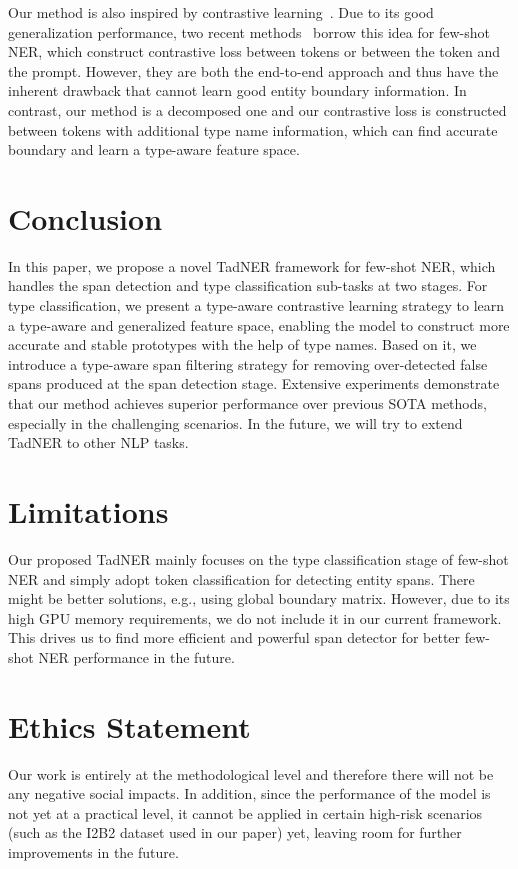 \documentclass[11pt]{article}
\newcommand{\ours}{{TadNER}\xspace}
\begin{document}
Our method is also inspired by contrastive learning~\cite{pmlr-v119-chen20j,NEURIPS2020_d89a66c7_supervised_contrastive_learning}.
Due to its good generalization performance, two recent methods~\cite{das-etal-2022-container,huang-etal-2022-copner} borrow this idea for few-shot NER, which construct contrastive loss between tokens or between the token and the prompt.
However, they are both the end-to-end approach and thus have the inherent drawback that cannot learn good entity boundary information.
In contrast, our method is a decomposed one and our contrastive loss is constructed between tokens with additional type name information, which can find accurate boundary and learn a type-aware feature space.





\section{Conclusion}
In this paper, we propose a novel \ours framework  for few-shot NER, which handles the span detection and type classification sub-tasks at two stages.
For type classification, we present a type-aware contrastive learning  strategy to learn a type-aware and generalized feature space, enabling the model to construct more accurate and stable prototypes with the help of type names.
Based on it, we introduce a type-aware span filtering strategy for removing over-detected false spans produced at the span detection stage.
Extensive experiments demonstrate that our method achieves superior performance over previous SOTA methods, especially in the challenging scenarios.
In the future, we will try to extend \ours to other NLP tasks.





\section*{Limitations}
Our proposed \ours mainly focuses on the type classification stage of few-shot NER and simply adopt token classification for detecting entity spans.
There might be better solutions, e.g., using global boundary matrix. 
However, due to its high GPU memory requirements, we do not include it in our current framework. 
This drives us to find more efficient and powerful span detector for better few-shot NER performance in the future.

\section*{Ethics Statement}
Our work is entirely at the methodological level and therefore there will not be any negative social impacts. 
In addition, since the performance of the model is not yet at a practical level, it cannot be applied in certain high-risk scenarios (such as the I2B2 dataset used in our paper) yet, leaving room for further improvements in the future.
\end{document}
